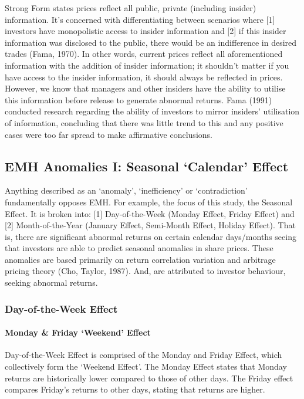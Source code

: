 \documentclass[11pt, english]{article}
\begin{document}
			Strong Form states prices reflect all public, private (including insider) information. It’s concerned with differentiating between scenarios where [1] investors have monopolistic access to insider information and [2] if this insider information was disclosed to the public, there would be an indifference in desired trades (Fama, 1970). In other words, current prices reflect all aforementioned information with the addition of insider information; it shouldn’t matter if you have access to the insider information, it should always be reflected in prices. However, we know that managers and other insiders have the ability to utilise this information before release to generate abnormal returns. Fama (1991) conducted research regarding the ability of investors to mirror insiders' utilisation of information, concluding that there was little trend to this and any positive cases were too far spread to make affirmative conclusions.

	\newpage

	\subsection{EMH Anomalies I: Seasonal `Calendar' Effect}

	Anything described as an `anomaly', `inefficiency' or `contradiction' fundamentally opposes EMH. For example, the focus of this study, the Seasonal Effect. It is broken into: [1] Day-of-the-Week (Monday Effect, Friday Effect) and [2] Month-of-the-Year (January Effect, Semi-Month Effect, Holiday Effect). That is, there are significant abnormal returns on certain calendar days/months seeing that investors are able to predict seasonal anomalies in share prices. These anomalies are based primarily on return correlation variation and arbitrage pricing theory (Cho, Taylor, 1987). And, are attributed to investor behaviour, seeking abnormal returns.

		\subsubsection{Day-of-the-Week Effect}

			\paragraph{Monday \& Friday `Weekend' Effect}

			Day-of-the-Week Effect is comprised of the Monday and Friday Effect, which collectively form the `Weekend Effect'. The Monday Effect states that Monday returns are historically lower compared to those of other days. The Friday effect compares Friday’s returns to other days, stating that returns are higher.
\end{document}
